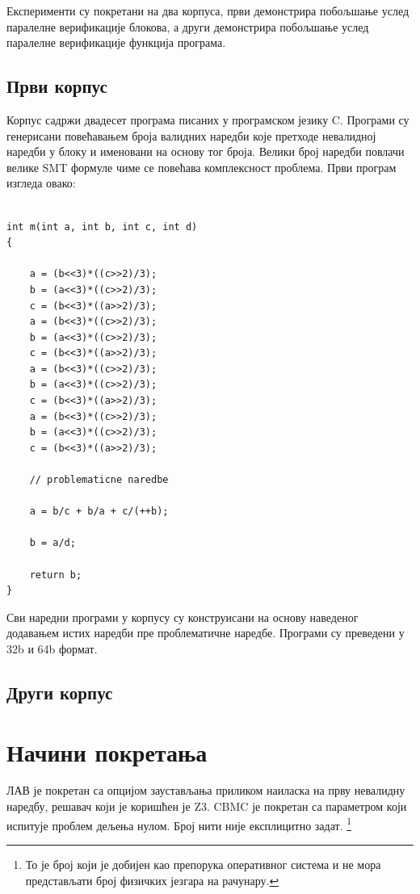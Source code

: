 \documentclass[12pt,oneside]{memoir}
\begin{document}
  Експерименти су покретани на два корпуса, први демонстрира побољшање услед паралелне верификације блокова, а други демонстрира побољшање услед паралелне верификације функција програма.
  \subsection{Први корпус}
  
  Корпус садржи двадесет програма писаних у програмском језику C. Програми су генерисани повећавањем броја валидних наредби које претходе невалидној наредби у блоку и именовани на основу тог броја. Велики број наредби повлачи велике SMT формуле чиме се повећава комплексност проблема. 	Први програм изгледа овако:
  \\
  
\begin{verbatim}

int m(int a, int b, int c, int d)
{

	a = (b<<3)*((c>>2)/3);
	b = (a<<3)*((c>>2)/3);
	c = (b<<3)*((a>>2)/3);
	a = (b<<3)*((c>>2)/3);
	b = (a<<3)*((c>>2)/3);
	c = (b<<3)*((a>>2)/3);
	a = (b<<3)*((c>>2)/3);
	b = (a<<3)*((c>>2)/3);
	c = (b<<3)*((a>>2)/3);
	a = (b<<3)*((c>>2)/3);
	b = (a<<3)*((c>>2)/3);
	c = (b<<3)*((a>>2)/3);

	// problematicne naredbe
	
	a = b/c + b/a + c/(++b);

	b = a/d;
	
	return b;
}

\end{verbatim}   

Сви наредни програми у корпусу су конструисани на основу наведеног додавањем истих наредби пре проблематичне наредбе. Програми су преведени у 32b и 64b формат.	  
  \subsection{Други корпус}

\newpage
    
  \section{Начини покретања}
ЛАВ је покретан са опцијом заустављања приликом наиласка на прву невалидну наредбу, решавач који је коришћен је Z3. CBMC је покретан са параметром који испитује проблем дељења нулом. Број нити није експлицитно задат. \footnote{То је број који је добијен као препорука оперативног система и не мора представљати број физичких језгара на рачунару.}
\end{document}
